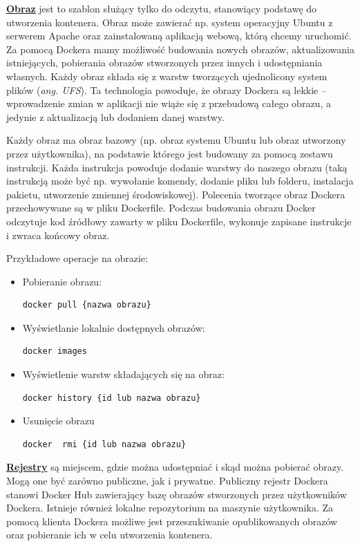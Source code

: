 	\textbf{\underline{Obraz}} jest to szablon służący tylko do odczytu, stanowiący podstawę do utworzenia kontenera. Obraz może zawierać np. system operacyjny Ubuntu z serwerem Apache oraz zainstalowaną aplikacją webową, którą chcemy uruchomić. Za pomocą Dockera mamy możliwość budowania nowych obrazów, aktualizowania istniejących, pobierania obrazów stworzonych przez innych i udostępniania własnych. Każdy obraz składa się z warstw tworzących ujednolicony system plików (\textit{ang. UFS}).  Ta technologia powoduje, że obrazy Dockera są lekkie – wprowadzenie zmian w aplikacji nie wiąże się z przebudową całego obrazu, a jedynie z aktualizacją lub dodaniem danej warstwy.
	
	Każdy obraz ma obraz bazowy (np. obraz systemu Ubuntu lub obraz utworzony przez użytkownika), na podstawie którego jest budowany za pomocą zestawu instrukcji. Każda instrukcja powoduje dodanie warstwy do naszego obrazu (taką instrukcją może być np. wywołanie komendy, dodanie pliku lub folderu, instalacja pakietu, utworzenie zmiennej środowiskowej). Polecenia tworzące obraz Dockera przechowywane są w pliku Dockerfile. Podczas budowania obrazu Docker odczytuje kod źródłowy zawarty w pliku Dockerfile, wykonuje zapisane instrukcje i zwraca końcowy obraz.

Przykładowe operacje na obrazie:
\begin{itemize}
\item Pobieranie obrazu:
\begin{lstlisting}[style=incode]
docker pull {nazwa obrazu}
\end{lstlisting}
\item Wyświetlanie lokalnie dostępnych obrazów:
\begin{lstlisting}[style=incode]
docker images
\end{lstlisting}
\item Wyświetlenie warstw składających się na obraz:
\begin{lstlisting}[style=incode]
docker history {id lub nazwa obrazu}
\end{lstlisting}
\item Usunięcie obrazu
\begin{lstlisting}[style=incode]
docker  rmi {id lub nazwa obrazu}
\end{lstlisting}
	
\end{itemize}

	\textbf{\underline{Rejestry}} są miejscem, gdzie można udostępniać i skąd można pobierać obrazy. Mogą one być zarówno publiczne, jak i prywatne.  Publiczny rejestr Dockera stanowi Docker Hub zawierający bazę obrazów stworzonych przez użytkowników Dockera. Istnieje również lokalne repozytorium na maszynie użytkownika. Za pomocą klienta Dockera możliwe jest przeszukiwanie opublikowanych obrazów oraz pobieranie ich w celu utworzenia kontenera. 
	
